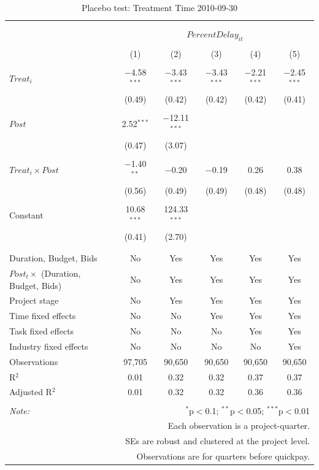\documentclass[
]{article}
\begin{document}
\begin{table}[H] \centering 
  \caption{Placebo test: Treatment Time 2010-09-30} 
  \label{} 
\small 
\begin{tabular}{@{\extracolsep{-2pt}}lccccc} 
\\[-1.8ex]\hline 
\hline \\[-1.8ex] 
\\[-1.8ex] & \multicolumn{5}{c}{$PercentDelay_{it}$} \\ 
\\[-1.8ex] & (1) & (2) & (3) & (4) & (5)\\ 
\hline \\[-1.8ex] 
 $Treat_i$ & $-$4.58$^{***}$ & $-$3.43$^{***}$ & $-$3.43$^{***}$ & $-$2.21$^{***}$ & $-$2.45$^{***}$ \\ 
  & (0.49) & (0.42) & (0.42) & (0.42) & (0.41) \\ 
  & & & & & \\ 
 $Post$ & 2.52$^{***}$ & $-$12.11$^{***}$ &  &  &  \\ 
  & (0.47) & (3.07) &  &  &  \\ 
  & & & & & \\ 
 $Treat_i \times Post$ & $-$1.40$^{**}$ & $-$0.20 & $-$0.19 & 0.26 & 0.38 \\ 
  & (0.56) & (0.49) & (0.49) & (0.48) & (0.48) \\ 
  & & & & & \\ 
 Constant & 10.68$^{***}$ & 124.33$^{***}$ &  &  &  \\ 
  & (0.41) & (2.70) &  &  &  \\ 
  & & & & & \\ 
\hline \\[-1.8ex] 
Duration, Budget, Bids & No & Yes & Yes & Yes & Yes \\ 
$Post_t \times$  (Duration, Budget, Bids) & No & Yes & Yes & Yes & Yes \\ 
Project stage & No & Yes & Yes & Yes & Yes \\ 
Time fixed effects & No & No & Yes & Yes & Yes \\ 
Task fixed effects & No & No & No & Yes & Yes \\ 
Industry fixed effects & No & No & No & No & Yes \\ 
Observations & 97,705 & 90,650 & 90,650 & 90,650 & 90,650 \\ 
R$^{2}$ & 0.01 & 0.32 & 0.32 & 0.37 & 0.37 \\ 
Adjusted R$^{2}$ & 0.01 & 0.32 & 0.32 & 0.36 & 0.36 \\ 
\hline 
\hline \\[-1.8ex] 
\textit{Note:}  & \multicolumn{5}{r}{$^{*}$p$<$0.1; $^{**}$p$<$0.05; $^{***}$p$<$0.01} \\ 
 & \multicolumn{5}{r}{Each observation is a project-quarter.} \\ 
 & \multicolumn{5}{r}{SEs are robust and clustered at the project level.} \\ 
 & \multicolumn{5}{r}{Observations are for quarters before quickpay.} \\ 
\end{tabular} 
\end{table}
\end{document}
